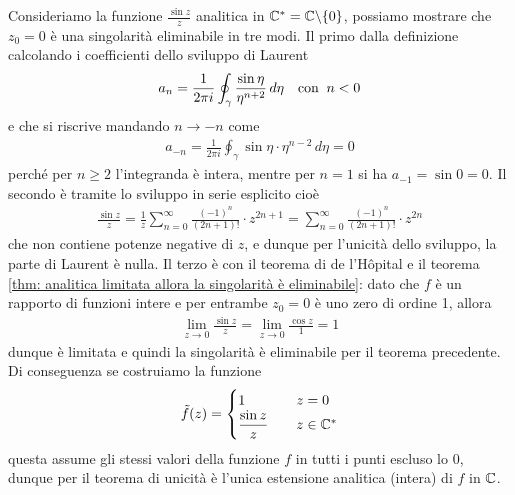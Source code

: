 \begin{example}
  Consideriamo la funzione $ \frac{\sin z}{z} $ analitica in $ \mathbb{C}^* = \mathbb{C}\backslash\{0\} $, possiamo mostrare che $ z_0 = 0 $ è una singolarità eliminabile 
  in tre modi. Il primo dalla definizione calcolando i coefficienti dello sviluppo di Laurent 
  \begin{align}
    a_n = \frac1{2\pi i} \oint_\gamma \frac{\sin \eta}{\eta^{n+2}} \,d\eta \quad \textnormal{con}\;\; n < 0
  \end{align}
  e che si riscrive mandando $ n \to -n $ come
  \begin{align}
    a_{-n} = \frac1{2\pi i} \oint_\gamma {\sin \eta}\cdot{\eta^{n-2}} \,d\eta = 0
  \end{align}
  perché per $ n \geq 2 $ l'integranda è intera, mentre per $ n = 1 $ si ha $ a_{-1} = \sin 0 = 0 $. 
  Il secondo è tramite lo sviluppo in serie esplicito cioè 
  \begin{align}
    \frac{\sin z}{z} = \frac1z \sum_{n = 0}^{\infty} \frac{(-1)^n}{(2n +1)!} \cdot z^{2n +1} = \sum_{n = 0}^{\infty} \frac{(-1)^n}{(2n +1)!} \cdot z^{2n}
  \end{align}
  che non contiene potenze negative di $ z $, e dunque per l'unicità dello sviluppo, la parte di Laurent è nulla. Il terzo è con il teorema di de 
  l'Hôpital e il teorema \ref{thm: analitica limitata allora la singolarità è eliminabile}: 
  dato che $ f $ è un rapporto di funzioni intere e per entrambe $ z_0 = 0 $ è uno zero di ordine 1, allora 
  \begin{align}
    \lim_{z \to 0} \frac{\sin z}{z} =\lim_{z\to 0} \frac{\cos z}{1} = 1
  \end{align}
  dunque è limitata e quindi la singolarità è eliminabile per il teorema precedente. Di conseguenza se costruiamo la funzione
  \begin{align}
    \tilde{f}(z) =
    \begin{cases}
      \displaystyle 1 &\quad z = 0
      \\
      \displaystyle \frac{\sin z}{z} &\quad z \in \mathbb{C}^*
    \end{cases}
  \end{align}
  questa assume gli stessi valori della funzione $ f $ in tutti i punti escluso lo $ 0 $, dunque per il teorema di unicità è l'unica estensione analitica 
  (intera) di $ f $ in $ \mathbb{C} $.
\end{example}

